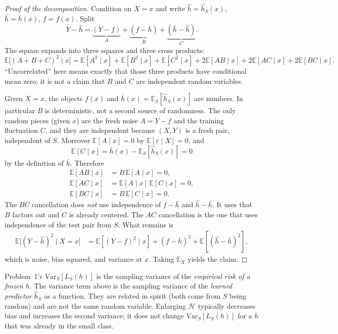 \begin{proof}[Proof of the decomposition]
Condition on $X=x$ and write $\widehat{h}=\widehat{h}_S(x)$, $\bar h=\bar h(x)$, $f=f(x)$. Split
\[
Y-\widehat{h}
=
\underbrace{(Y-f)}_{A}
+
\underbrace{(f-\bar h)}_{B}
+
\underbrace{(\bar h-\widehat{h})}_{C}.
\]
The square expands into three squares and three cross products:
\[
\mathbb{E}\bigl[(A+B+C)^2\mid x\bigr]
=
\mathbb{E}[A^2\mid x]+\mathbb{E}[B^2\mid x]+\mathbb{E}[C^2\mid x]
+2\mathbb{E}[AB\mid x]+2\mathbb{E}[AC\mid x]+2\mathbb{E}[BC\mid x].
\]
``Uncorrelated'' here means exactly that those three products have conditional mean zero; it is not a claim that $B$ and $C$ are independent random variables.

Given $X=x$, the objects $f(x)$ and $\bar h(x)=\mathbb{E}_S[\widehat{h}_S(x)]$ are numbers. In particular $B$ is deterministic, not a second source of randomness. The only random pieces (given $x$) are the fresh noise $A=Y-f$ and the training fluctuation $C$, and they are independent because $(X,Y)$ is a fresh pair, independent of $S$. Moreover $\mathbb{E}[A\mid x]=0$ by $\mathbb{E}[\varepsilon\mid X]=0$, and
\[
\mathbb{E}[C\mid x]
=
\bar h(x)-\mathbb{E}_S[\widehat{h}_S(x)]
=
0
\]
by the definition of $\bar h$. Therefore
\begin{align*}
\mathbb{E}[AB\mid x]
&=
B\,\mathbb{E}[A\mid x]
=
0,\\
\mathbb{E}[AC\mid x]
&=
\mathbb{E}[A\mid x]\,\mathbb{E}[C\mid x]
=
0,\\
\mathbb{E}[BC\mid x]
&=
B\,\mathbb{E}[C\mid x]
=
0.
\end{align*}
The $BC$ cancellation does \emph{not} use independence of $f-\bar h$ and $\widehat{h}-\bar h$. It uses that $B$ factors out and $C$ is already centered. The $AC$ cancellation is the one that uses independence of the test pair from $S$. What remains is
\begin{align*}
\mathbb{E}\bigl[(Y-\widehat{h})^2\mid X=x\bigr]
&=
\mathbb{E}[(Y-f)^2\mid x]
+
(f-\bar h)^2
+
\mathbb{E}[(\widehat{h}-\bar h)^2],
\end{align*}
which is noise, bias squared, and variance at $x$. Taking $\mathbb{E}_X$ yields the claim.
\end{proof}

\begin{remark}
\label{rem:mlu-two-variances}
Problem~1's $\mathrm{Var}_S[L_S(h)]$ is the sampling variance of the \emph{empirical risk of a frozen $h$}. The variance term above is the sampling variance of the \emph{learned predictor} $\widehat{h}_S$ as a function. They are related in spirit (both come from $S$ being random) and are not the same random variable. Enlarging $\mathcal{H}$ typically decreases bias and increases the second variance; it does not change $\mathrm{Var}_S[L_S(h)]$ for a $h$ that was already in the small class.
\end{remark}

